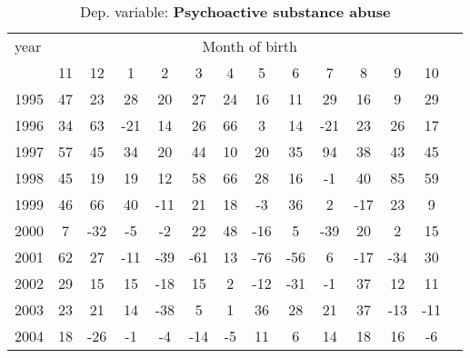  \begin{table}[H] \begin{threeparttable} \centering \caption{Dep. variable: \textbf{Psychoactive substance abuse}} {\def\sym#1{\ifmmode^{#1}\else\(^{#1}\)\fi} \begin{tabular}{l*{13}{c}} \toprule year & \multicolumn{12}{c}{Month of birth} \\ \cmidrule(lr){2-13} 
            &          11&          12&           1&           2&           3&           4&           5&           6&           7&           8&           9&          10\\
1995        &          47&          23&          28&          20&          27&          24&          16&          11&          29&          16&           9&          29\\
1996        &          34&          63&         -21&          14&          26&          66&           3&          14&         -21&          23&          26&          17\\
1997        &          57&          45&          34&          20&          44&          10&          20&          35&          94&          38&          43&          45\\
1998        &          45&          19&          19&          12&          58&          66&          28&          16&          -1&          40&          85&          59\\
1999        &          46&          66&          40&         -11&          21&          18&          -3&          36&           2&         -17&          23&           9\\
2000        &           7&         -32&          -5&          -2&          22&          48&         -16&           5&         -39&          20&           2&          15\\
2001        &          62&          27&         -11&         -39&         -61&          13&         -76&         -56&           6&         -17&         -34&          30\\
2002        &          29&          15&          15&         -18&          15&           2&         -12&         -31&          -1&          37&          12&          11\\
2003        &          23&          21&          14&         -38&           5&           1&          36&          28&          21&          37&         -13&         -11\\
2004        &          18&         -26&          -1&          -4&         -14&          -5&          11&           6&          14&          18&          16&          -6\\

\end{tabular}}
\end{threeparttable}
\end{table}
